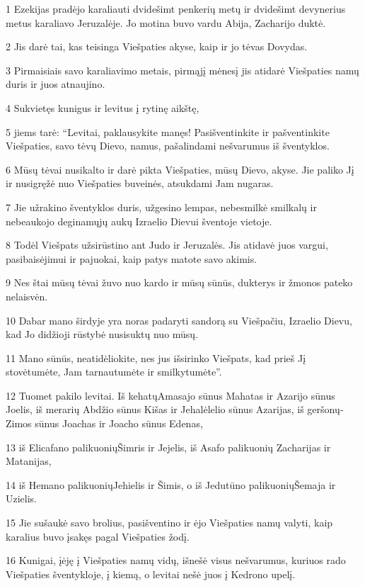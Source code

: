 \par 1 Ezekijas pradėjo karaliauti dvidešimt penkerių metų ir dvidešimt devynerius metus karaliavo Jeruzalėje. Jo motina buvo vardu Abija, Zacharijo duktė. 
\par 2 Jis darė tai, kas teisinga Viešpaties akyse, kaip ir jo tėvas Dovydas. 
\par 3 Pirmaisiais savo karaliavimo metais, pirmąjį mėnesį jis atidarė Viešpaties namų duris ir juos atnaujino. 
\par 4 Sukvietęs kunigus ir levitus į rytinę aikštę, 
\par 5 jiems tarė: “Levitai, paklausykite manęs! Pasišventinkite ir pašventinkite Viešpaties, savo tėvų Dievo, namus, pašalindami nešvarumus iš šventyklos. 
\par 6 Mūsų tėvai nusikalto ir darė pikta Viešpaties, mūsų Dievo, akyse. Jie paliko Jį ir nusigręžė nuo Viešpaties buveinės, atsukdami Jam nugaras. 
\par 7 Jie užrakino šventyklos duris, užgesino lempas, nebesmilkė smilkalų ir nebeaukojo deginamųjų aukų Izraelio Dievui šventoje vietoje. 
\par 8 Todėl Viešpats užsirūstino ant Judo ir Jeruzalės. Jis atidavė juos vargui, pasibaisėjimui ir pajuokai, kaip patys matote savo akimis. 
\par 9 Nes štai mūsų tėvai žuvo nuo kardo ir mūsų sūnūs, dukterys ir žmonos pateko nelaisvėn. 
\par 10 Dabar mano širdyje yra noras padaryti sandorą su Viešpačiu, Izraelio Dievu, kad Jo didžioji rūstybė nusisuktų nuo mūsų. 
\par 11 Mano sūnūs, neatidėliokite, nes jus išsirinko Viešpats, kad prieš Jį stovėtumėte, Jam tarnautumėte ir smilkytumėte”. 
\par 12 Tuomet pakilo levitai. Iš kehatų­Amasajo sūnus Mahatas ir Azarijo sūnus Joelis, iš merarių­ Abdžio sūnus Kišas ir Jehalėlelio sūnus Azarijas, iš geršonų­Zimos sūnus Joachas ir Joacho sūnus Edenas, 
\par 13 iš Elicafano palikuonių­Šimris ir Jejelis, iš Asafo palikuonių­ Zacharijas ir Matanijas, 
\par 14 iš Hemano palikuonių­Jehielis ir Šimis, o iš Jedutūno palikuonių­Šemaja ir Uzielis. 
\par 15 Jie sušaukė savo brolius, pasišventino ir ėjo Viešpaties namų valyti, kaip karalius buvo įsakęs pagal Viešpaties žodį. 
\par 16 Kunigai, įėję į Viešpaties namų vidų, išnešė visus nešvarumus, kuriuos rado Viešpaties šventykloje, į kiemą, o levitai nešė juos į Kedrono upelį. 
